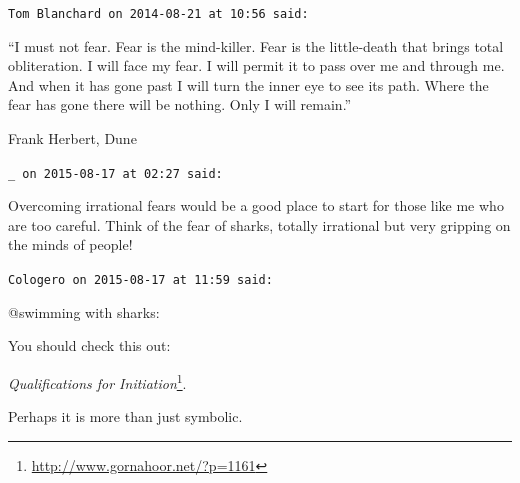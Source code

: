\begin{footnotesize}
\begin{sffamily}
\texttt{Tom Blanchard on 2014-08-21 at 10:56 said:}

``I must not fear. Fear is the mind-killer. Fear is the little-death that brings total obliteration. I will face my fear. I will permit it to pass over me and through me. And when it has gone past I will turn the inner eye to see its path. Where the fear has gone there will be nothing. Only I will remain.''

Frank Herbert, Dune

\hfill

\texttt{\_ on 2015-08-17 at 02:27 said:}

Overcoming irrational fears would be a good place to start for those like me who are too careful. Think of the fear of sharks, totally irrational but very gripping on the minds of people!

\hfill

\texttt{Cologero on 2015-08-17 at 11:59 said:}

@swimming with sharks:

You should check this out:

\textit{Qualifications for Initiation}\footnote{\url{http://www.gornahoor.net/?p=1161}}.

Perhaps it is more than just symbolic.

\hfill

\end{sffamily}
\end{footnotesize}

